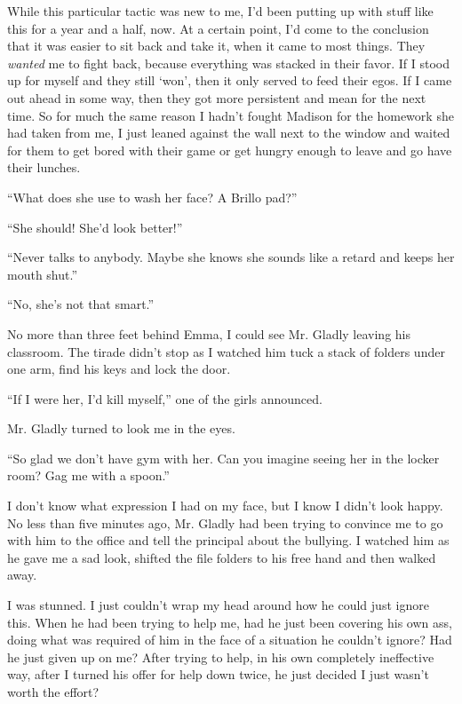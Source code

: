 While this particular tactic was new to me, I'd been putting up with stuff like this for a year and a half, now.  At a certain point, I'd come to the conclusion that it was easier to sit back and take it, when it came to most things.  They \emph{wanted} me to fight back, because everything was stacked in their favor.  If I stood up for myself and they still `won', then it only served to feed their egos.  If I came out ahead in some way, then they got more persistent and mean for the next time.  So for much the same reason I hadn't fought Madison for the homework she had taken from me, I just leaned against the wall next to the window and waited for them to get bored with their game or get hungry enough to leave and go have their lunches.



``What does she use to wash her face?  A Brillo pad?''



``She should!  She'd look better!''



``Never talks to anybody.  Maybe she knows she sounds like a retard and keeps her mouth shut.''



``No, she's not that smart.''



No more than three feet behind Emma, I could see Mr. Gladly leaving his classroom.  The tirade didn't stop as I watched him tuck a stack of folders under one arm, find his keys and lock the door.



``If I were her, I'd kill myself,'' one of the girls announced.



Mr. Gladly turned to look me in the eyes.



``So glad we don't have gym with her.  Can you imagine seeing her in the locker room?  Gag me with a spoon.''



I don't know what expression I had on my face, but I know I didn't look happy.  No less than five minutes ago, Mr. Gladly had been trying to convince me to go with him to the office and tell the principal about the bullying.  I watched him as he gave me a sad look, shifted the file folders to his free hand and then walked away.



I was stunned.  I just couldn't wrap my head around how he could just ignore this.  When he had been trying to help me, had he just been covering his own ass, doing what was required of him in the face of a situation he couldn't ignore?  Had he just given up on me?  After trying to help, in his own completely ineffective way, after I turned his offer for help down twice, he just decided I just wasn't worth the effort?




